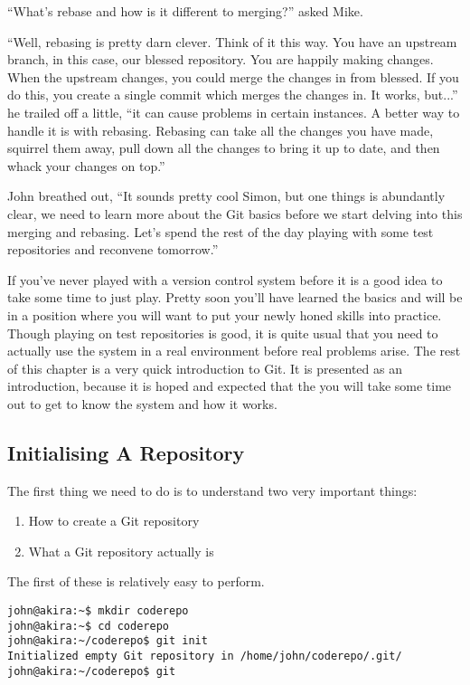 \begin{trenches}
``What's rebase and how is it different to merging?'' asked Mike. 

``Well, rebasing is pretty darn clever.  Think of it this way.  You have an upstream branch, in this case, our blessed repository.  You are happily making changes.  When the upstream changes, you could merge the changes in from blessed.  If you do this, you create a single commit which merges the changes in.  It works, but...'' he trailed off a little, ``it can cause problems in certain instances.  A better way to handle it is with rebasing.  Rebasing can take all the changes you have made, squirrel them away, pull down all the changes to bring it up to date, and then whack your changes on top.''

John breathed out, ``It sounds pretty cool Simon, but one things is abundantly clear, we need to learn more about the Git basics before we start delving into this merging and rebasing.  Let's spend the rest of the day playing with some test repositories and reconvene tomorrow.''
\end{trenches}

If you've never played with a version control system before it is a good idea to take some time to just play.  Pretty soon you'll have learned the basics and will be in a position where you will want to put your newly honed skills into practice.  Though playing on test repositories is good, it is quite usual that you need to actually use the system in a real environment before real problems arise.  The rest of this chapter is a very quick introduction to Git.  It is presented as an introduction, because it is hoped and expected that the you will take some time out to get to know the system and how it works. 

\subsection{Initialising A Repository}
The first thing we need to do is to understand two very important things: 

\begin{enumerate}
  \item How to create a Git repository 
  \item What a Git repository actually is 
\end{enumerate}

The first of these is relatively easy to perform.  

\begin{Verbatim}[frame=single,fontsize=\relsize{-3}]
john@akira:~$ mkdir coderepo 
john@akira:~$ cd coderepo 
john@akira:~/coderepo$ git init 
Initialized empty Git repository in /home/john/coderepo/.git/ 
john@akira:~/coderepo$ git 
\end{Verbatim} 

